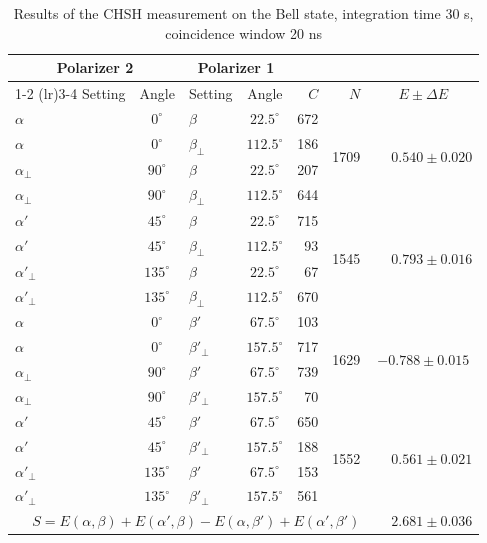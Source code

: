 \documentclass[a4paper,
DIV=13,
12pt,
BCOR=10mm,
department=FakEI,
twoside,
parskip=half,
automark,
logostyle=flat,
]{OTHRartcl}
\begin{document}
\begin{table}[htbp]
  \centering
  \begin{tabular}{l c l c r r c}
    \toprule
    \multicolumn{2}{c}{Polarizer 2} & \multicolumn{2}{c}{Polarizer 1}
      & & & \\
    \cmidrule(lr){1-2} \cmidrule(lr){3-4}
    Setting & Angle & Setting & Angle & $C$ & $N$ & $E \pm \Delta E$ \\
    \midrule
    $\alpha$       & $0^\circ$  & $\beta$       & $22.5^\circ$  & 672
      & \multirow{4}{*}{1709} & \multirow{4}{*}{$\phantom{-}0.540 \pm 0.020$} \\
    $\alpha$       & $0^\circ$  & $\beta_\perp$ & $112.5^\circ$ & 186 & & \\
    $\alpha_\perp$ & $90^\circ$ & $\beta$       & $22.5^\circ$  & 207 & & \\
    $\alpha_\perp$ & $90^\circ$ & $\beta_\perp$ & $112.5^\circ$ & 644 & & \\
    \midrule
    $\alpha'$       & $45^\circ$  & $\beta$       & $22.5^\circ$  & 715
      & \multirow{4}{*}{1545} & \multirow{4}{*}{$\phantom{-}0.793 \pm 0.016$} \\
    $\alpha'$       & $45^\circ$  & $\beta_\perp$ & $112.5^\circ$ & 93 & & \\
    $\alpha'_\perp$ & $135^\circ$ & $\beta$       & $22.5^\circ$  & 67 & & \\
    $\alpha'_\perp$ & $135^\circ$ & $\beta_\perp$ & $112.5^\circ$ & 670 & & \\
    \midrule
    $\alpha$       & $0^\circ$  & $\beta'$       & $67.5^\circ$  & 103
      & \multirow{4}{*}{1629} & \multirow{4}{*}{$-0.788 \pm 0.015$} \\
    $\alpha$       & $0^\circ$  & $\beta'_\perp$ & $157.5^\circ$ & 717 & & \\
    $\alpha_\perp$ & $90^\circ$ & $\beta'$       & $67.5^\circ$  & 739 & & \\
    $\alpha_\perp$ & $90^\circ$ & $\beta'_\perp$ & $157.5^\circ$ & 70 & & \\
    \midrule
    $\alpha'$       & $45^\circ$  & $\beta'$       & $67.5^\circ$  & 650
      & \multirow{4}{*}{1552} & \multirow{4}{*}{$\phantom{-}0.561 \pm 0.021$} \\
    $\alpha'$       & $45^\circ$  & $\beta'_\perp$ & $157.5^\circ$ & 188 & & \\
    $\alpha'_\perp$ & $135^\circ$ & $\beta'$       & $67.5^\circ$  & 153 & & \\
    $\alpha'_\perp$ & $135^\circ$ & $\beta'_\perp$ & $157.5^\circ$ & 561 & & \\
    \midrule
    \multicolumn{6}{r}{$S = E(\alpha,\beta) + E(\alpha',\beta)
                            - E(\alpha,\beta') + E(\alpha',\beta')$}
      & $\phantom{-}2.681 \pm 0.036$ \\
    \bottomrule
  \end{tabular}
  \caption{Results of the CHSH measurement on the Bell state, integration time 30 s, coincidence window 20 ns}
  \label{tab:chsh}
\end{table}
\end{document}
